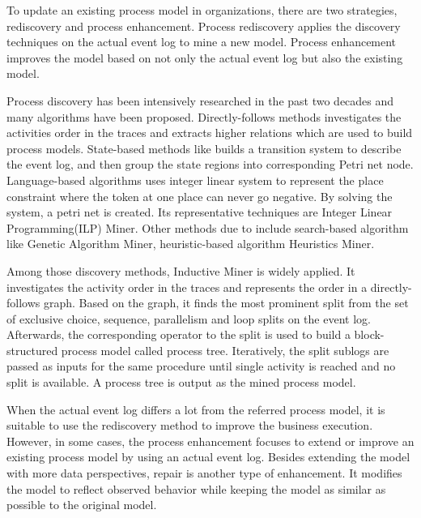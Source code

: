 To update an existing process model in organizations, there are two strategies, rediscovery and process enhancement. Process rediscovery applies the discovery techniques on the actual event log to mine a new model. Process enhancement improves the model based on not only the actual event log but also the existing model. 


Process discovery has been intensively researched in the past two decades and many algorithms have been proposed\cite{van2016data}. Directly-follows\cite{van2004workflow, leemans2013discovering} methods investigates the activities order in the traces and extracts higher relations which are used to build process models. State-based methods like \cite{bergenthum2007process, cortadella1995synthesizing}  builds a transition system to describe the event log, and then group the state regions into corresponding Petri net node. Language-based algorithms uses integer linear system to represent the place constraint where the token at one place can never go negative. By solving the system, a petri net is created. Its representative techniques are Integer Linear Programming(ILP) Miner\cite{van2008process}. Other methods due to \cite{van2009process} include search-based algorithm like Genetic Algorithm Miner\cite{de2007genetic}, heuristic-based algorithm Heuristics Miner\cite{weijters2003rediscovering}.

Among those discovery methods, Inductive Miner is widely applied\cite{leemans2013discovering}. It investigates the activity order in the traces and represents the order in a directly-follows graph. Based on the graph, it finds the most prominent split from the set of exclusive choice, sequence, parallelism and loop splits on the event log.  Afterwards, the corresponding operator to the split is used to build a block-structured process model called process tree. Iteratively, the  split sublogs are passed as inputs for the same procedure until single activity is reached and no split is available. A process tree is output as the mined process model.

When the actual event log differs a lot from the referred process model, it is suitable to use the rediscovery method to improve the business execution. However, in some cases, the process enhancement focuses to extend or improve an existing process model by using an actual event log\cite{van2011process}. Besides extending the model with more data perspectives, repair is another type of enhancement. It modifies the model to reflect observed behavior while keeping the model as similar as possible to the original model.

